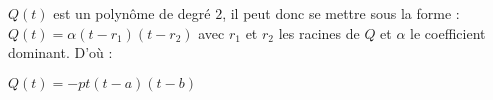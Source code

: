 $Q(t)$ est un polynôme de degré $2$, il peut donc se mettre sous la forme :
$Q(t) = \alpha (t-r_1)(t-r_2)$
avec $r_1$ et $r_2$ les racines de $Q$ et $\alpha$ le coefficient dominant.
D'où :
\begin{result}
  $Q(t) = -pt(t-a)(t-b)$
\end{result}
